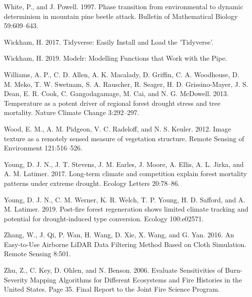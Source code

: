 \documentclass[twoside,12pt,final]{ucthesis-CA2012}
\begin{document}
\begin{ucmainmatter}
\hypertarget{ref-white1997}{}
White, P., and J. Powell. 1997. Phase transition from environmental to
dynamic determinism in mountain pine beetle attack. Bulletin of
Mathematical Biology 59:609--643.

\hypertarget{ref-wickham2017}{}
Wickham, H. 2017. Tidyverse: Easily Install and Load the 'Tidyverse'.

\hypertarget{ref-wickham2019}{}
Wickham, H. 2019. Modelr: Modelling Functions that Work with the Pipe.

\hypertarget{ref-parkwilliams2013}{}
Williams, A. P., C. D. Allen, A. K. Macalady, D. Griffin, C. A.
Woodhouse, D. M. Meko, T. W. Swetnam, S. A. Rauscher, R. Seager, H. D.
Grissino-Mayer, J. S. Dean, E. R. Cook, C. Gangodagamage, M. Cai, and N.
G. McDowell. 2013. Temperature as a potent driver of regional forest
drought stress and tree mortality. Nature Climate Change 3:292--297.

\hypertarget{ref-wood2012}{}
Wood, E. M., A. M. Pidgeon, V. C. Radeloff, and N. S. Keuler. 2012.
Image texture as a remotely sensed measure of vegetation structure.
Remote Sensing of Environment 121:516--526.

\hypertarget{ref-young2017}{}
Young, D. J. N., J. T. Stevens, J. M. Earles, J. Moore, A. Ellis, A. L.
Jirka, and A. M. Latimer. 2017. Long-term climate and competition
explain forest mortality patterns under extreme drought. Ecology Letters
20:78--86.

\hypertarget{ref-young2019}{}
Young, D. J. N., C. M. Werner, K. R. Welch, T. P. Young, H. D. Safford,
and A. M. Latimer. 2019. Post-fire forest regeneration shows limited
climate tracking and potential for drought-induced type conversion.
Ecology 100:e02571.

\hypertarget{ref-zhang2016}{}
Zhang, W., J. Qi, P. Wan, H. Wang, D. Xie, X. Wang, and G. Yan. 2016. An
Easy-to-Use Airborne LiDAR Data Filtering Method Based on Cloth
Simulation. Remote Sensing 8:501.

\hypertarget{ref-zhu2006}{}
Zhu, Z., C. Key, D. Ohlen, and N. Benson. 2006. Evaluate Sensitivities
of Burn-Severity Mapping Algorithms for Different Ecosystems and Fire
Histories in the United States. Page 35. Final Report to the Joint Fire
Science Program.

\end{ucmainmatter}
\end{document}
